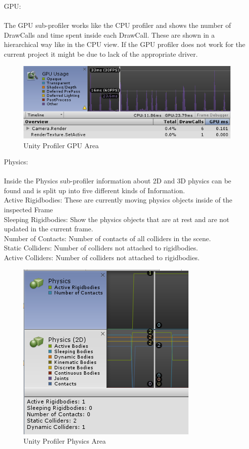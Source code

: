 GPU:\\
\\
The GPU sub-profiler works like the CPU profiler and shows the number of DrawCalls and time spent inside each DrawCall. These are shown in a hierarchical way like in the CPU view. If the GPU profiler does not work for the current project it might be due to lack of the appropriate driver.

\begin{figure}[htbp]
\includegraphics[scale = 0.53]{img/UnityProfilerGPU.PNG}
\caption{Unity Profiler GPU Area}
\label{fig:UnityProfilerGPU}
\end{figure}

Physics:\\
\\
Inside the Physics sub-profiler information about 2D and 3D physics can be found and is split up into five different kinds of Information.\\
Active Rigidbodies: These are currently moving physics objects inside of the inspected Frame\\
Sleeping Rigidbodies: Show the physics objects that are at rest and are not updated in the current frame.\\
Number of Contacts: Number of contacts of all colliders in the scene.\\
Static Colliders: Number of colliders not attached to rigidbodies.\\
Active Colliders: Number of colliders not attached to rigidbodies.\\

\begin{figure}[htbp]
\includegraphics[scale = 0.53]{img/UnityProfilerPhysics.PNG}
\caption{Unity Profiler Physics Area}
\label{fig:UnityProfilerPhysics}
\end{figure}


